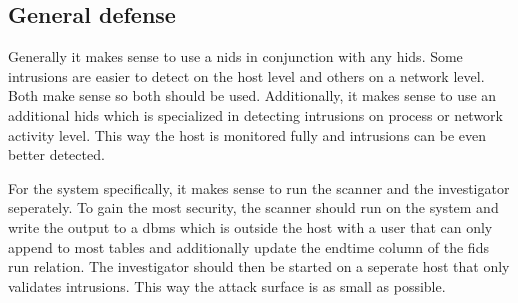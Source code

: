\subsection{General defense}
\label{sec:defense:general}

Generally it makes sense to use a \gls{nids} in conjunction with any \gls{hids}. Some intrusions are easier to detect on the host level and others on a network level. Both make sense so both should be used. Additionally, it makes sense to use an additional \gls{hids} which is specialized in detecting intrusions on process or network activity level. This way the host is monitored fully and intrusions can be even better detected. 

For the system specifically, it makes sense to run the scanner and the investigator seperately. To gain the most security, the scanner should run on the system and write the output to a \gls{dbms} which is outside the host with a user that can only append to most tables and additionally update the endtime column of the fids run relation. The investigator should then be started on a seperate host that only validates intrusions. This way the attack surface is as small as possible. 

